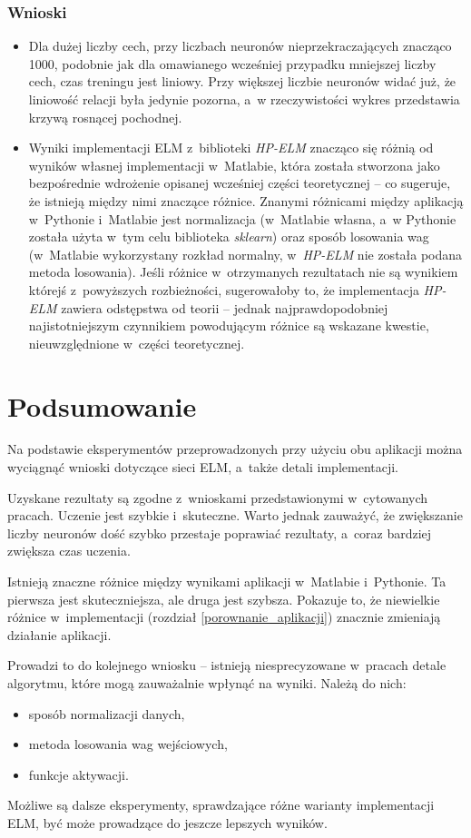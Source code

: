 \documentclass[pl]{minipw} %
\begin{document}
\subsection{Wnioski}
\begin{itemize}
\item Dla dużej liczby cech, przy liczbach neuronów nieprzekraczających znacząco 1000, podobnie jak dla omawianego wcześniej przypadku mniejszej liczby cech, czas treningu jest liniowy. Przy większej liczbie neuronów widać już, że liniowość relacji była jedynie pozorna, a~w rzeczywistości wykres przedstawia krzywą rosnącej pochodnej.
\item Wyniki implementacji ELM z~biblioteki \textit{HP-ELM} znacząco się różnią od wyników własnej implementacji w~Matlabie, która została stworzona jako bezpośrednie wdrożenie opisanej wcześniej części teoretycznej -- co sugeruje, że istnieją między nimi znaczące różnice. Znanymi różnicami między aplikacją w~Pythonie i~Matlabie jest normalizacja (w~Matlabie własna, a~w Pythonie została użyta w~tym celu biblioteka \textit{sklearn}) oraz sposób losowania wag (w~Matlabie wykorzystany rozkład normalny, w~\textit{HP-ELM} nie została podana metoda losowania). Jeśli różnice w~otrzymanych rezultatach nie są wynikiem którejś z~powyższych rozbieżności, sugerowałoby to, że implementacja \textit{HP-ELM} zawiera odstępstwa od teorii -- jednak najprawdopodobniej najistotniejszym czynnikiem powodującym różnice są wskazane kwestie, nieuwzględnione w~części teoretycznej.
\end{itemize}
\clearpage
\chapter*{Podsumowanie}
Na podstawie eksperymentów przeprowadzonych przy użyciu obu aplikacji można wyciągnąć wnioski dotyczące sieci ELM, a~także detali implementacji.

Uzyskane rezultaty są zgodne z~wnioskami przedstawionymi w~cytowanych pracach.
Uczenie jest szybkie i~skuteczne.
Warto jednak zauważyć, że zwiększanie liczby neuronów dość szybko przestaje poprawiać rezultaty, a~coraz bardziej zwiększa czas uczenia.

Istnieją znaczne różnice między wynikami aplikacji w~Matlabie i~Pythonie. Ta pierwsza jest skuteczniejsza, ale druga jest szybsza. Pokazuje to, że niewielkie różnice w~implementacji (rozdział \ref{porownanie_aplikacji}) znacznie zmieniają działanie aplikacji.

Prowadzi to do kolejnego wniosku -- istnieją niesprecyzowane w~pracach detale algorytmu, które mogą zauważalnie wpłynąć na wyniki.
Należą do nich:
\begin{itemize}
\item sposób normalizacji danych, 
\item metoda losowania wag wejściowych,
\item funkcje aktywacji.
\end{itemize}
Możliwe są dalsze eksperymenty, sprawdzające różne warianty implementacji ELM, być może prowadzące do jeszcze lepszych wyników.
\clearpage
\end{document}

